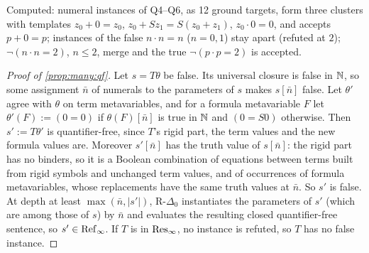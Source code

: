 \noindent Computed: numeral instances of Q4--Q6, as 12 ground targets, form three clusters with templates
$z_0+0=z_0$, $z_0+Sz_1=S(z_0+z_1)$, $z_0\cdot0=0$, and \DTRC{} accepts $p+0=p$; instances of the false $n\cdot n=n$
($n=0,1$) stay apart (refuted at $2$); $\neg(n\cdot n=2)$, $n\le2$, merge and the true $\neg(p\cdot p=2)$ is accepted.

\begin{proof}[Proof of \cref{prop:many:qf}]
Let $s=T\theta$ be false. Its universal closure is false in $\mathbb{N}$, so some assignment $\bar n$ of numerals to the
parameters of $s$ makes $s[\bar n]$ false. Let $\theta'$ agree with $\theta$ on term metavariables, and for a formula
metavariable $F$ let $\theta'(F):=(0=0)$ if $\theta(F)[\bar n]$ is true in $\mathbb{N}$ and $(0=S0)$ otherwise. Then $s':=T\theta'$
is quantifier-free, since $T$'s rigid part, the term values and the new formula values are. Moreover $s'[\bar n]$ has the
truth value of $s[\bar n]$: the rigid part has no binders, so it is a Boolean combination of equations between terms built
from rigid symbols and unchanged term values, and of occurrences of formula metavariables, whose replacements have the
same truth values at $\bar n$. So $s'$ is false. At depth at least $\max(\bar n,|s'|)$, R-$\Delta_0$ instantiates the
parameters of $s'$ (which are among those of $s$) by $\bar n$ and evaluates the resulting closed quantifier-free sentence,
so $s'\in\mathrm{Ref}_\infty$. If $T$ is in $\mathrm{Res}_\infty$, no instance is refuted, so $T$ has no false instance.
\end{proof}

